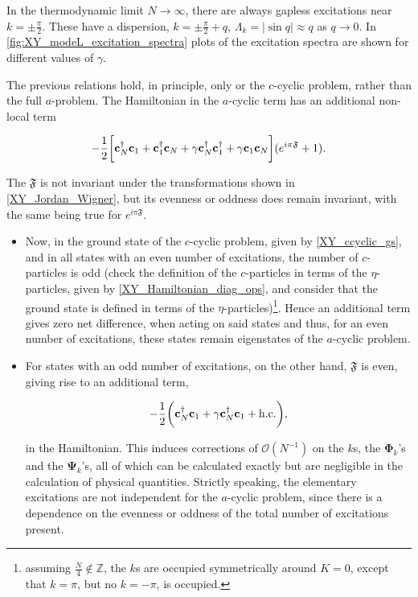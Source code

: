 \documentclass{homework}
\begin{document}
In the thermodynamic limit $N \rightarrow \infty$, there are always gapless excitations near $k = \pm \frac{\pi}{2}$. These have a dispersion, $k = \pm \frac{\pi}{2} + q$, $\Lambda_k = |\sin q| \approx q$ as $q \rightarrow 0$. In \cref{fig:XY_modeL_excitation_spectra} plots of the excitation spectra are shown for different values of $\gamma$. \\

\begin{tcolorbox}[colback = yellow, title = Physical Context]

The previous relations hold, in principle, only or the $c$-cyclic problem, rather than the full $a$-problem. The Hamiltonian in the $a$-cyclic term has an additional non-local term 

$$
 - \frac{1}{2} \bigg[{\bf c}_N^\dagger {\bf c}_1 + {\bf c}_1^\dagger {\bf c}_N + \gamma {\bf c}_N^\dagger {\bf c}_1^\dagger + \gamma {\bf c}_1 {\bf c}_N\bigg] (e^{i\pi \mathfrak{F}} + 1).
$$

The $\mathfrak{F}$ is not invariant under the transformations shown in \cref{XY_Jordan_Wigner}, but its evenness or oddness does remain invariant, with the same being true for $e^{i\pi \mathfrak{F}}$. 

\begin{itemize}
    \item Now, in the ground state of the $c$-cyclic problem, given by \cref{XY_ccyclic_gs}, and in all states with an even number of excitations, the number of $c$-particles is odd (check the definition of the $c$-particles in terms of the $\eta$-particles, given by \cref{XY_Hamiltonian_diag_ops}, and consider that the ground state is defined in terms of the $\eta$-particles)\footnote{assuming $\frac{N}{4} \notin \mathds{Z}$, the $k$s are occupied symmetrically around $K = 0$, except that $k = \pi$, but no $k= -\pi$, is occupied. }. Hence an additional term gives zero net difference, when acting on said states and thus, for an even number of excitations, these states remain eigenstates of the $a$-cyclic problem. \\
    \item For states with an odd number of excitations, on the other hand, $\mathfrak{F}$ is even, giving rise to an additional term, 
    
    $$
        - \frac{1}{2} \bigg({\bf c}_N^\dagger {\bf c}_1+ \gamma {\bf c}_N^\dagger{\bf c}_1 + \textnormal{h.c.} \bigg),
    $$
    
    in the Hamiltonian. This induces corrections of $\mathcal{O}(N^{-1})$ on the $k$s, the $\bm{\Phi}_k$'s and the $\bm{\Psi}_k$'s, all of which can be calculated exactly but are negligible in the calculation of physical quantities. Strictly speaking, the elementary excitations are not independent for the $a$-cyclic problem, since there is a dependence on the evenness or oddness of the total number of excitations present. 
\end{itemize}

\end{tcolorbox}
\end{document}
